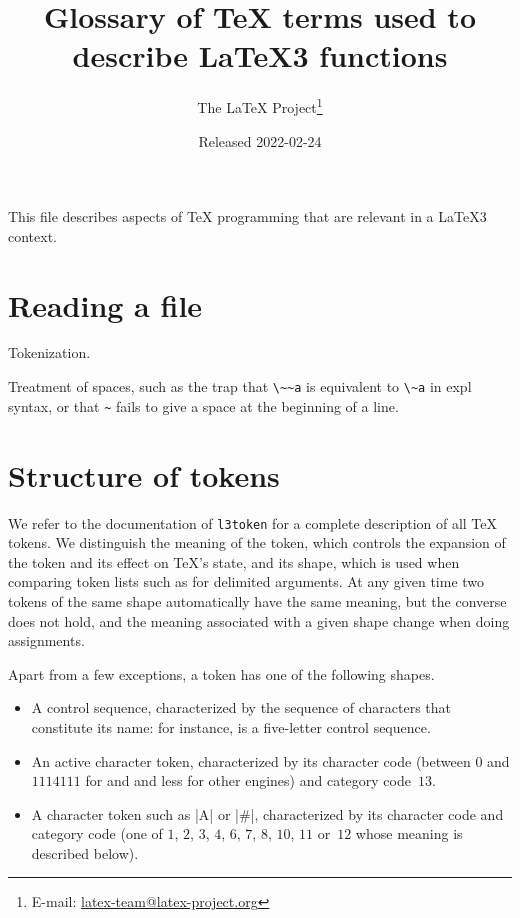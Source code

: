 \documentclass{l3doc}
\title{%
  Glossary of \TeX{} terms used to describe \LaTeX3 functions%
}
\author{%
  The \LaTeX{} Project\thanks
    {%
      E-mail:
      \href{mailto:latex-team@latex-project.org}%
        {latex-team@latex-project.org}%
    }%
}
\date{Released 2022-02-24}
\begin{document}
\maketitle

This file describes aspects of \TeX{} programming that are relevant in a
\LaTeX3 context.

\section{Reading a file}

Tokenization.

Treatment of spaces, such as the trap that \verb|\~~a| is equivalent to
\verb|\~a| in expl syntax, or that \verb|~| fails to give a space at the
beginning of a line.

\section{Structure of tokens}

We refer to the documentation of \texttt{l3token} for a complete
description of all \TeX{} tokens.  We distinguish the meaning of the
token, which controls the expansion of the token and its effect on
\TeX{}'s state, and its shape, which is used when comparing token lists
such as for delimited arguments.  At any given time two tokens of the
same shape automatically have the same meaning, but the converse does
not hold, and the meaning associated with a given shape change when
doing assignments.

Apart from a few exceptions, a token has one of the following shapes.
\begin{itemize}
  \item A control sequence, characterized by the sequence of characters
    that constitute its name: for instance,  is a five-letter
    control sequence.
  \item An active character token, characterized by its character code
    (between $0$ and $1114111$ for \LuaTeX{} and \XeTeX{} and less for
    other engines) and category code~$13$.
  \item A character token such as |A| or |#|, characterized by its
    character code and category code (one of $1$, $2$, $3$, $4$, $6$,
    $7$, $8$, $10$, $11$ or~$12$ whose meaning is described below).
\end{itemize}
\end{document}
